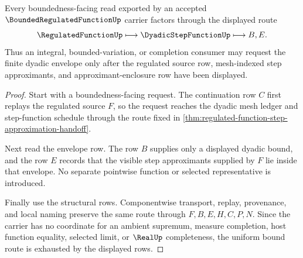 \begin{theorem}
\label{thm:bounded-regulated-function-uniform-bound-route}
Every boundedness-facing read exported by an accepted $\BoundedRegulatedFunctionUp$ carrier factors through the displayed route
$$
\RegulatedFunctionUp \longmapsto \DyadicStepFunctionUp \longmapsto B,E .
$$
Thus an integral, bounded-variation, or completion consumer may request the finite dyadic envelope only after the regulated source row, mesh-indexed step approximants, and approximant-enclosure row have been displayed.
\end{theorem}
\begin{proof}
Start with a boundedness-facing request. The continuation row $C$ first replays the regulated source $F$, so the request reaches the dyadic mesh ledger and step-function schedule through the route fixed in \autoref{thm:regulated-function-step-approximation-handoff}.

Next read the envelope row. The row $B$ supplies only a displayed dyadic bound, and the row $E$ records that the visible step approximants supplied by $F$ lie inside that envelope. No separate pointwise function or selected representative is introduced.

Finally use the structural rows. Componentwise transport, replay, provenance, and local naming preserve the same route through $F,B,E,H,C,P,N$. Since the carrier has no coordinate for an ambient supremum, measure completion, host function equality, selected limit, or $\RealUp$ completeness, the uniform bound route is exhausted by the displayed rows.
\end{proof}

